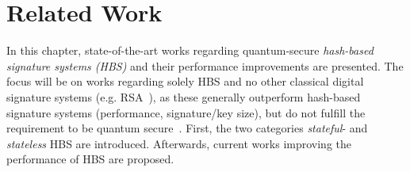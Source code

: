 \chapter{Related Work}
\label{cha:stateOfTheArt}

In this chapter, state-of-the-art works regarding quantum-secure \textit{hash-based signature systems (HBS)} and their performance improvements are presented. The focus will be on works regarding solely HBS and no other classical digital signature systems (e.g. RSA~\cite{rsa_patent}), as these generally outperform hash-based signature systems (performance, signature/key size), but do not fulfill the requirement to be quantum secure~\cite{RSA_pq-attack_examples_2018,comparison_performance_RSA_ECDSA_Merkle_WOTS_2021}.
First, the two categories \textit{stateful}- and \textit{stateless} HBS are introduced. Afterwards, current works improving the performance of HBS are proposed.

